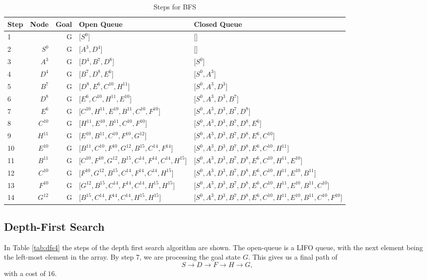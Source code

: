 \documentclass{article}
\begin{document}
    \begin{table}[!htp]\centering
        \caption{Steps for BFS}\label{tab:bfs4}
        \scriptsize
        \begin{tabular}{lrrll}\toprule
        Step &Node &Goal & Open Queue &Closed Queue  \\\midrule
        1&  &G &[$S^0$] &[] \\
        2& $S^0$ &G &[$A^3, D^4$] &[] \\
        3& $A^3$ &G &[$D^4, B^7, D^8$] &[$S^0$] \\
        4& $D^4$ &G &[$B^7, D^8, E^6$] &[$S^0, A^3$] \\
        5& $B^7$ &G &[$D^8, E^6, C^{10}, H^{11}$] &[$S^0, A^3, D^3$] \\
        6& $D^8$ &G &[$E^6, C^{10}, H^{11}, E^{10}$] &[$S^0, A^3, D^3, B^7$] \\
        7& $E^6$ &G &[$C^{10}, H^{11}, E^{10}, B^{11}, C^{10}, F^{10}$] &[$S^0, A^3, D^3, B^7, D^{8}$] \\
        8& $C^{10}$ &G &[$H^{11}, E^{10}, B^{11}, C^{10}, F^{10}$] &[$S^0, A^3, D^3, B^7, D^{8}, E^{6}$] \\
        9& $H^{11}$ &G &[$E^{10}, B^{11}, C^{10}, F^{10}, G^{12}$] &[$S^0, A^3, D^3, B^7, D^{8}, E^{6}, C^{10}$] \\
        10& $E^{10}$ &G &[$B^{11}, C^{10}, F^{10}, G^{12}, B^{15}, C^{14}, F^{14}$] &[$S^0, A^3, D^3, B^7, D^{8}, E^{6}, C^{10}, H^{11}$] \\
        11& $B^{11}$ &G &[$C^{10}, F^{10}, G^{12}, B^{15}, C^{14}, F^{14}, C^{14}, H^{15}$] &[$S^0, A^3, D^3, B^7, D^{8}, E^{6}, C^{10}, H^{11}, E^{10}$] \\
        12& $C^{10}$ &G &[$F^{10}, G^{12}, B^{15}, C^{14}, F^{14}, C^{14}, H^{15}$] &[$S^0, A^3, D^3, B^7, D^{8}, E^{6}, C^{10}, H^{11}, E^{10}, B^{11}$] \\
        13& $F^{10}$ &G &[$G^{12}, B^{15}, C^{14}, F^{14}, C^{14}, H^{15}, H^{15}$] &[$S^0, A^3, D^3, B^7, D^{8}, E^{6}, C^{10}, H^{11}, E^{10}, B^{11}, C^{10}$] \\
        14& $G^{12}$ &G &[$B^{15}, C^{14}, F^{14}, C^{14}, H^{15}, H^{15}$] &[$S^0, A^3, D^3, B^7, D^{8}, E^{6}, C^{10}, H^{11}, E^{10}, B^{11}, C^{10}, F^{10}$] \\
        \bottomrule
        \end{tabular}
    \end{table}
\subsection{Depth-First Search}
    In Table \ref{tab:dfs4} the steps of the depth first search algorithm are shown. The open-queue is a LIFO queue, with the next element being the left-most element in the array. 
    By step 7, we are processing the goal state $G$. This gives us a final path of
    \begin{equation}
        S \rightarrow D \rightarrow F \rightarrow H \rightarrow G,
    \end{equation}
    with a cost of $16$.
\end{document}
